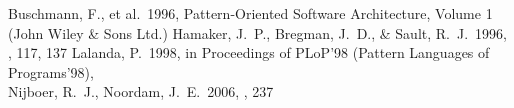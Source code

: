 \documentclass[11pt,twoside]{article}  %
\begin{document}
%
\begin{references}
 Buschmann, F., et al.\ 1996, Pattern-Oriented Software
  Architecture, Volume 1 (John Wiley \& Sons Ltd.)
 Hamaker, J.~P., Bregman, J.~D., \& Sault, R.~J.\ 1996, 
  \aap, 117, 137 
 Lalanda, P.\ 1998, in Proceedings of PLoP'98
  (Pattern Languages of Programs'98),\\
 Nijboer, R.~J., Noordam, J.~E.\ 2006, \adassxvi, 237
\end{references}

\end{document}
